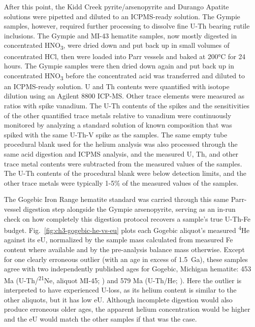 After this point, the Kidd Creek pyrite/arsenopyrite and Durango Apatite solutions were pipetted and diluted to an ICPMS-ready solution. The Gympie samples, however, required further processing to dissolve fine U-Th bearing rutile inclusions. The Gympie and MI-43 hematite samples, now mostly digested
in concentrated HNO\textsubscript{3}, were dried down and put back up in small volumes of concentrated HCl, then were loaded into Parr vessels and baked at 200°C for 24 hours. 
The Gympie samples were then dried down again and put back up in concentrated HNO\textsubscript{3} before the concentrated acid was transferred and diluted to an ICPMS-ready solution. U and Th contents were quantified with isotope dilution using an Agilent 8800 ICP-MS. 
Other trace elements were measured as ratios with spike vanadium. The U-Th contents of the spikes and the sensitivities of the other quantified trace metals relative to vanadium were continuously monitored by analyzing a standard solution of known composition that was spiked with the same U-Th-V spike as the samples.
The same empty tube procedural blank used for the helium analysis was also processed through the same acid digestion and ICPMS analysis, and the measured U, Th, and other trace metal contents were subtracted from the measured values of the samples. The U-Th contents of the procedural blank were below detection limits, and the other trace metals were typically 1-5\% of the measured values of the samples.

The Gogebic Iron Range hematite standard \citep{farleymckeon2015} was carried through this same Parr-vessel digestion step alongside the Gympie arsenopyrite, serving as an in-run check on how completely this digestion protocol recovers a sample's true U-Th-Fe budget. Fig.~\ref{fig:ch3-gogebic-he-vs-eu} plots each Gogebic aliquot's measured \textsuperscript{4}He against its eU, normalized by the sample mass calculated from measured Fe content where available 
and by the pre-analysis balance mass otherwise. Except for one clearly erroneous outlier (with an age in excess of 1.5~Ga), 
these samples agree with two independently published ages for Gogebic, Michigan hematite: 453 Ma (U-Th/\textsuperscript{21}Ne, aliquot MI-45; \citealp{farleymckeon2015}) 
and 579 Ma (U-Th/He; \citealp{hofmann2020}). Here the outlier is interpreted to have experienced U-loss, as its helium content is similar to the other aliquots, but it has low eU. 
Although incomplete digestion would also produce erroneous older ages, the apparent helium concentration would be higher and the eU would match the other samples if that was the case.

